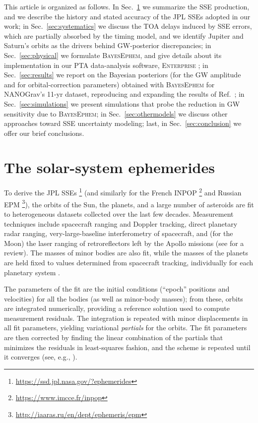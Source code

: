 \documentclass[reprint,
 amsmath,amssymb,
 aps,prd,floatfix,
]{revtex4-1}
\begin{document}
This article is organized as follows. In Sec.\ \ref{sec:sses} we summarize the SSE production, and we describe the history and stated accuracy of the JPL SSEs adopted in our work; in Sec.\ \ref{sec:systematics} we discuss the TOA delays induced by SSE errors, which are partially absorbed by the timing model, and we identify Jupiter and Saturn's orbits as the drivers behind GW-posterior discrepancies; in Sec.\ \ref{sec:physical} we formulate \textsc{BayesEphem}, and give details about its implementation in our PTA data-analysis software, \textsc{Enterprise} \cite{enterprise}; in Sec.\ \ref{sec:results} we report on the Bayesian posteriors (for the GW amplitude and for orbital-correction parameters) obtained with \textsc{BayesEphem} for NANOGrav's 11-yr dataset, reproducing and expanding the results of Ref.\ \cite{2018ApJ...859...47A};
in Sec.\ \ref{sec:simulations} we present simulations that probe the reduction in GW sensitivity due to \textsc{BayesEphem};
in Sec.\ \ref{sec:othermodels} we discuss other approaches toward SSE uncertainty modeling;
last, in Sec.\ \ref{sec:conclusion} we offer our brief conclusions.  

\section{The solar-system ephemerides}
\label{sec:sses}

To derive the JPL SSEs \footnote{\href{https://ssd.jpl.nasa.gov/?ephemerides}{https://ssd.jpl.nasa.gov/?ephemerides}} (and similarly for the French INPOP \footnote{\href{https://www.imcce.fr/inpop}{https://www.imcce.fr/inpop}} and Russian EPM \footnote{\href{http://iaaras.ru/en/dept/ephemeris/epm}{http://iaaras.ru/en/dept/ephemeris/epm}}),
the orbits of the Sun, the planets, and a large number of asteroids are fit to heterogeneous datasets collected over the last few decades. Measurement techniques include spacecraft ranging and Doppler tracking, direct planetary radar ranging, very-large-baseline interferometry of spacecraft, and (for the Moon) the laser ranging of retroreflectors left by the Apollo missions (see \cite{verma2013} for a review). The masses of minor bodies are also fit, while the masses of the planets are held fixed to values determined from spacecraft tracking, individually for each planetary system \cite{jh+2000,2006AJ....132.2520J,2014AJ....148...76J,2009AJ....137.4322J}.

The parameters of the fit are the initial conditions (``epoch'' positions and velocities) for all the bodies (as well as minor-body masses); from these, orbits are integrated numerically, providing a reference solution used to compute measurement residuals.
The integration is repeated with minor displacements in all fit parameters, yielding variational \emph{partials} for the orbits. The fit parameters are then corrected by finding the linear combination of the partials that minimizes the residuals in least-squares fashion, and the scheme is repeated until it converges (see, e.g., \cite{1983A&A...125..150N}).
\end{document}
